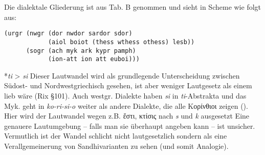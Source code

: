 \documentclass[12pt,a4paper,normalheadings]{scrartcl}
\newcounter{para}
\newcommand{\mypara}[1]{\vspace{1em}\par\noindent\refstepcounter{para}%
\textbf{\textsf{\thepara}}\enspace\textsf{#1}\quad}
\def\rek#1{*\textit{#1}}
\def\bel#1{\textit{#1}}
\begin{document}
Die dialektale Gliederung ist aus \cite{bart_frueh} Tab. B genommen
und sieht in Scheme wie folgt aus:
\begin{verbatim}
(urgr (nwgr (dor nwdor sardor sdor)
            (aiol boiot (thess wthess othess) lesb))
      (sogr (ach myk ark kypr pamph)
            (ion-att ion att euboi)))
\end{verbatim}

\mypara{\rek{ti} > \bel{si}}
Dieser Lautwandel wird als grundlegende Unterscheidung zwischen Südost-
und Nordwestgriechisch gesehen,
ist aber weniger Lautgesetz als einem lieb wäre (Rix §101).
Auch westgr. Dialekte haben \bel{si} in \emph{ti}-Abstrakta
und das Myk. geht in \bel{ko-ri-si-o} weiter als andere Dialekte,
die alle Κορίνθιοι zeigen (\cite[144]{bart_hand}).
Hier wird der Lautwandel wegen z.B. ἔστι, κτίσις
nach \bel{s} und \bel{k} ausgesetzt
Eine genauere Lautumgebung -- falls man sie überhaupt angeben kann --
ist unsicher.
Vermutlich ist der Wandel schlicht nicht lautgesetzlich
sondern als eine Verallgemeinerung von Sandhivarianten zu sehen
(und somit Analogie).

\printbibliography
\end{document}

